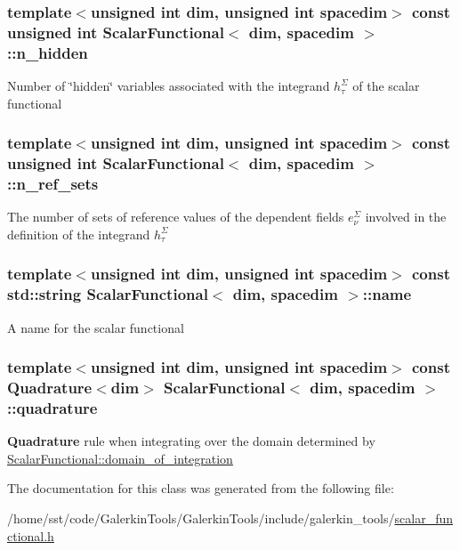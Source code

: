 \subsubsection[{\texorpdfstring{n\+\_\+hidden}{n_hidden}}]{\setlength{\rightskip}{0pt plus 5cm}template$<$unsigned int dim, unsigned int spacedim$>$ const unsigned int {\bf Scalar\+Functional}$<$ dim, spacedim $>$\+::n\+\_\+hidden}\hypertarget{class_scalar_functional_a8b1617930242870f22eef5e306cb717f}{}\label{class_scalar_functional_a8b1617930242870f22eef5e306cb717f}
Number of \char`\"{}hidden\char`\"{} variables associated with the integrand $h^\Sigma_\tau$ of the scalar functional 
\subsubsection[{\texorpdfstring{n\+\_\+ref\+\_\+sets}{n_ref_sets}}]{\setlength{\rightskip}{0pt plus 5cm}template$<$unsigned int dim, unsigned int spacedim$>$ const unsigned int {\bf Scalar\+Functional}$<$ dim, spacedim $>$\+::n\+\_\+ref\+\_\+sets}\hypertarget{class_scalar_functional_a7e12423f4b29e9e0aaa0f7f9c2d1c0eb}{}\label{class_scalar_functional_a7e12423f4b29e9e0aaa0f7f9c2d1c0eb}
The number of sets of reference values of the dependent fields $e^\Sigma_\nu$ involved in the definition of the integrand $h^\Sigma_\tau$ 
\subsubsection[{\texorpdfstring{name}{name}}]{\setlength{\rightskip}{0pt plus 5cm}template$<$unsigned int dim, unsigned int spacedim$>$ const std\+::string {\bf Scalar\+Functional}$<$ dim, spacedim $>$\+::name}\hypertarget{class_scalar_functional_a4d184688053b3443d10e228e4a8eba60}{}\label{class_scalar_functional_a4d184688053b3443d10e228e4a8eba60}
A name for the scalar functional 
\subsubsection[{\texorpdfstring{quadrature}{quadrature}}]{\setlength{\rightskip}{0pt plus 5cm}template$<$unsigned int dim, unsigned int spacedim$>$ const {\bf Quadrature}$<$dim$>$ {\bf Scalar\+Functional}$<$ dim, spacedim $>$\+::quadrature}\hypertarget{class_scalar_functional_adea9ff214aeb2a1d8c3712a9d2433883}{}\label{class_scalar_functional_adea9ff214aeb2a1d8c3712a9d2433883}
{\bf Quadrature} rule when integrating over the domain determined by \hyperlink{class_scalar_functional_ae3b6dd6934e1cd55fcc55cf344179407}{Scalar\+Functional\+::domain\+\_\+of\+\_\+integration} 

The documentation for this class was generated from the following file\+:\begin{DoxyCompactItemize}
\item 
/home/sst/code/\+Galerkin\+Tools/\+Galerkin\+Tools/include/galerkin\+\_\+tools/\hyperlink{scalar__functional_8h}{scalar\+\_\+functional.\+h}\end{DoxyCompactItemize}
